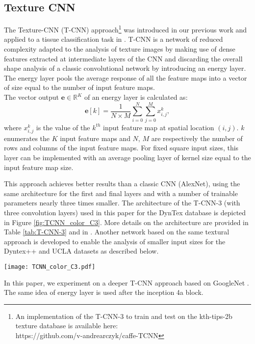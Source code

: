 \documentclass[a4paper,11pt]{article}
\newcommand{\field}[1]{\mathbb{#1}}
\newcommand{\R}{\field{R}}
\begin{document}
\subsection{Texture CNN}%
\label{subsec:TCNN}
The Texture-CNN (T-CNN) approach\footnote{An implementation of the T-CNN-3 to train and test on the kth-tips-2b texture database is available here:\\https://github.com/v-andrearczyk/caffe-TCNN} was introduced in our previous work \cite{andrearczyk2016using} and applied to a tissue classification task in \cite{andrearczyk2016deep}.
T-CNN is a network of reduced complexity adapted to the analysis of texture images by making use of dense features extracted at intermediate layers of the CNN and discarding the overall shape analysis of a classic convolutional network by introducing an energy layer.
The energy layer pools the average response of all the feature maps into a vector of size equal to the number of input feature maps.
\\The vector output $\mathbf{e} \in \R^K$ of an energy layer is calculated as:
\begin{equation} \label{eq:energy}
\mathbf{e}[k] = \dfrac{1}{N\times M}\sum\limits_{i=0}^N\sum\limits_{j=0}^M x_{i,j}^k ,
\end{equation}
where $x_{i,j}^k$ is the value of the $k^{th}$ input feature map at spatial location $(i,j)$. $k$ enumerates the $K$ input feature maps and $N$, $M$ are respectively the number of rows and columns of the input feature maps.
For fixed square input sizes, this layer can be implemented with an average pooling layer of kernel size equal to the input feature map size. 

This approach achieves better results than a classic CNN (AlexNet), using the same architecture for the first and final layers and with a number of trainable parameters nearly three times smaller.
The architecture of the T-CNN-3 (with three convolution layers) used in this paper for the DynTex database is depicted in Figure \ref{fig:TCNN_color_C3}.
More details on the architecture are provided in Table \ref{tab:T-CNN-3} and in \cite{andrearczyk2016using}.
Another network based on the same textural approach is developed to enable the analysis of smaller input sizes for the Dyntex++ and UCLA datasets as described below.
\begin{figure*}[!t]
\centering
\texttt{[image: TCNN\_color\_C3.pdf]}
  \caption{Texture CNN architecture using three convolution layers (T-CNN-3) \cite{andrearczyk2016using}.}\label{fig:TCNN_color_C3}
\end{figure*}
In this paper, we experiment on a deeper T-CNN approach based on GoogleNet \cite{szegedy2015going}.
The same idea of energy layer is used after the inception 4a block.
\end{document}
